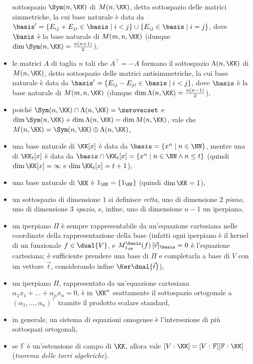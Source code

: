 \documentclass[10pt,landscape]{article}
\begin{document}
\begin{multicols}{3}
\begin{itemize}
			sottospazio $\Sym(n, \KK)$ di $M(n, \KK)$, detto sottospazio delle matrici
			simmetriche, la cui base naturale è data da
			$\basis' = \{E_{ij} + E_{ji} \in \basis \mid i < j\} \cup
			\{E_{ij} \in \basis \mid i = j\}$, dove $\basis$ è la
			base naturale di $M(m, n, \KK)$ (dunque $\dim \Sym(n, \KK) = \frac{n(n+1)}{2}$),
			\item le matrici $A$ di taglia $n$ tali che $A^\top = -A$ formano il
			sottospazio $\Lambda(n, \KK)$ di $M(n, \KK)$, detto sottospazio delle matrici
			antisimmetriche, la cui base naturale è data da
			$\basis' = \{E_{ij} - E_{ji} \in \basis \mid i < j\}$, dove $\basis$ è la
			base naturale di $M(m, n, \KK)$ (dunque $\dim \Lambda(n, \KK) = \frac{n(n-1)}{2}$),
			\item poiché $\Sym(n, \KK) \cap \Lambda(n, \KK) = \zerovecset$ e
			$\dim \Sym(n, \KK) + \dim \Lambda(n, \KK) = \dim M(n, \KK)$,
			vale che $M(n, \KK) = \Sym(n, \KK) \oplus \Lambda(n, \KK)$,
			\item una base naturale di $\KK[x]$ è data da $\basis = \{x^n \mid
			n \in \NN \}$, mentre una di $\KK_t[x]$ è data da $\basis \cap
			\KK_t[x] = \{x^n \mid n \in \NN \land n \leq t\}$ (quindi
			$\dim \KK[x] = \infty$ e $\dim \KK_t[x] = t+1$),
			\item una base naturale di $\KK$ è $1_\KK = \{1_\KK\}$ (quindi
			$\dim \KK = 1$),
			\item un sottospazio di dimensione $1$ si definisce \textit{retta},
			uno di dimensione $2$ \textit{piano}, uno di dimensione $3$
			\textit{spazio}, e, infine, uno di dimensione $n-1$ un iperpiano,
			\item un iperpiano $\Pi$ è sempre rappresentabile da un'equazione cartesiana
			nelle coordinate della rappresentazione della base (infatti ogni
			iperpiano è il kernel di un funzionale $f \in \dual{V}$, e $M^\basis_{1_\KK}(f) \, [\vec{v}]_\basis = 0$ è l'equazione cartesiana; è sufficiente prendere una base di $\Pi$ e completarla
			a base di $V$ con un vettore $\vec{t}$, considerando infine
			$\Ker \dual{\vec{t}}$),
			\item un iperpiano $\Pi$, rappresentato da un'equazione cartesiana $\alpha_1 x_1 + \ldots + \alpha_n x_n = 0$, è in $\KK^n$ esattamente il sottospazio ortogonale a $(\alpha_1, \ldots, \alpha_n)^\top$ tramite il prodotto scalare standard,
			\item in generale, un sistema di equazioni omogenee è l'intersezione di più
			sottospazi ortogonali,
			\item se $\mathbb{F}$ è un'estensione di campo di $\KK$, allora vale $[V : \KK] = [V : \mathbb{F}] [\mathbb{F} : \KK]$ (\textit{teorema delle torri algebriche}).
			

\end{itemize}
\end{multicols}
\end{document}
